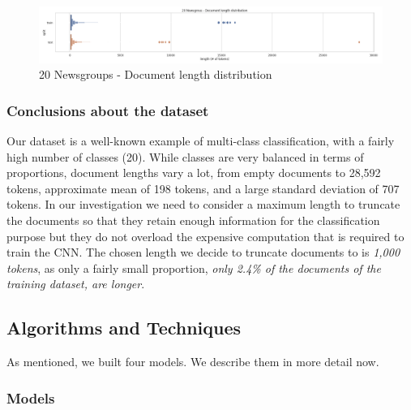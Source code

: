 \documentclass[10pt,journal,compsoc, onecolumn]{IEEEtran}
\begin{document}
\begin{figure}[h]
      \centering
      \includegraphics[width=\linewidth]{images/chart_06.png}
      \caption{20 Newsgroups - Document length distribution}
      \label{fig:doclength}
\end{figure}

\subsubsection{Conclusions about the dataset}

Our dataset is a well-known example of multi-class classification, with a fairly high number of classes (20). While classes are very balanced in terms of proportions, document lengths vary a lot, from empty documents to 28,592 tokens, approximate mean of 198 tokens, and a large standard deviation of 707 tokens. In our investigation we need to consider a maximum length to truncate the documents so that they retain enough information for the classification purpose but they do not overload the expensive computation that is required to train the CNN. The chosen length we decide to truncate documents to is \textit{1,000 tokens}, as only a fairly small proportion, \textit{only 2.4\% of the documents of the training dataset, are longer}. 


\subsection{Algorithms and Techniques}

As mentioned, we built four models. We describe them in more detail now.

\subsubsection{Models}
\end{document}

